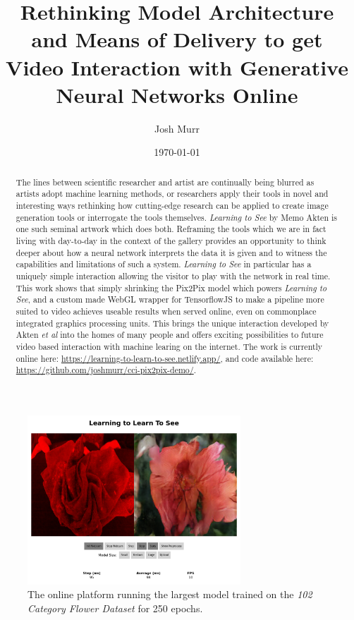 \documentclass{article}
\title{\vspace{-4em}Rethinking Model Architecture and Means of Delivery to get Video Interaction with Generative Neural Networks Online}
\date{\today}
\author{Josh Murr}
\begin{document}
\maketitle

\begin{abstract}
	The lines between scientific researcher and artist are continually being blurred as artists adopt machine learning methods\cite{anna_ridler}, or researchers apply their tools in novel and interesting ways\cite{deep_dream_guy} rethinking how cutting-edge research can be applied to create image generation tools or interrogate the tools themselves. \textit{Learning to See} by Memo Akten\cite{lts_memo} is one such seminal artwork which does both. Reframing the tools which we are in fact living with day-to-day in the context of the gallery provides an opportunity to think deeper about how a neural network interprets the data it is given and to witness the capabilities and limitations of such a system. \textit{Learning to See} in particular has a uniquely simple interaction allowing the visitor to play with the network in real time. This work shows that simply shrinking the Pix2Pix\cite{1611.07004} model which powers \textit{Learning to See}, and a custom made WebGL wrapper for TensorflowJS to make a pipeline more suited to video achieves useable results when served online, even on commonplace integrated graphics processing units. This brings the unique interaction developed by Akten \textit{et al}\cite{2003.00902} into the homes of many people and offers exciting possibilities to future video based interaction with machine learing on the internet. The work is currently online here: \url{https://learning-to-learn-to-see.netlify.app/}, and code available here: \url{https://github.com/joshmurr/cci-pix2pix-demo/}.
\end{abstract}

\begin{figure}[h!]
	\centering
	\includegraphics[width=8cm]{ltlts_online2}
	\caption{The online platform running the largest model trained on the \textit{102 Category Flower Dataset}\cite{flowers_dataset} for 250 epochs.}
\end{figure}
\end{document}
